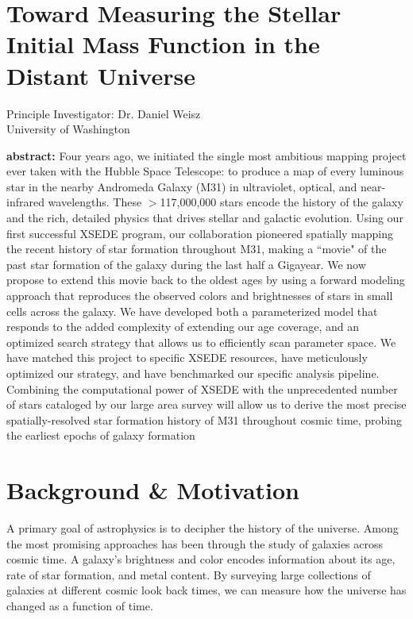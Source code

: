 \documentclass[11pt,preprint]{aastex}
\begin{document}
\section*{\Large Toward Measuring the Stellar Initial Mass Function in the Distant Universe}


\begin{center}
Principle Investigator: Dr. Daniel Weisz\\
University of Washington
\end{center}

{\small
{\bf abstract:}
Four years ago, we initiated the single most ambitious mapping project
ever taken with the Hubble Space Telescope: to produce a map of every
luminous star in the nearby Andromeda Galaxy (M31) in ultraviolet,
optical, and near-infrared wavelengths. These $>$117,000,000 stars
encode the history of the galaxy and the rich, detailed physics that
drives stellar and galactic evolution. Using our first successful XSEDE
program, our collaboration pioneered spatially mapping the recent
history of star formation throughout M31, making a ``movie" of the past
star formation of the galaxy during the last half a Gigayear.  We now
propose to extend this movie back to the oldest ages by using a
forward modeling approach that reproduces the observed colors and
brightnesses of stars in small cells across the galaxy. We have
developed both a parameterized model that responds to the added
complexity of extending our age coverage, and an optimized search
strategy that allows us to efficiently scan parameter space.  We have
matched this project to specific XSEDE resources, have meticulously
optimized our strategy, and have benchmarked our specific analysis
pipeline.  Combining the computational power of XSEDE with the
unprecedented number of stars cataloged by our large area survey will
allow us to derive the most precise spatially-resolved star formation
history of M31 throughout cosmic time, probing the earliest epochs of
galaxy formation }


\section{Background \& Motivation}
\label{sec:overview}

A primary goal of astrophysics is to decipher the history of the universe.  Among the most promising approaches has been through the study of galaxies across cosmic time. A galaxy's brightness and color encodes information about its age, rate of star formation, and metal content.  By surveying large collections of galaxies at different cosmic look back times, we can measure how the universe has changed as a function of time.  
\end{document}

